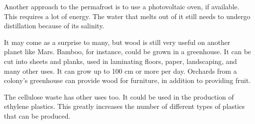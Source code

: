 Another approach to the permafrost is to use a photovoltaic oven, if available. This requires a lot of energy. The water that melts out of it still needs to undergo distillation because of its salinity.

It may come as a surprise to many, but wood is still very useful on another planet like Mars. Bamboo, for instance, could be grown in a greenhouse. It can be cut into sheets and planks, used in laminating floors, paper, landscaping, and many other uses. It can grow up to 100 cm or more per day. Orchards from a colony's greenhouse can provide wood for furniture, in addition to providing fruit. 

The cellulose waste has other uses too. It could be used in the production of ethylene plastics. This greatly increases the number of different types of plastics that can be produced.

